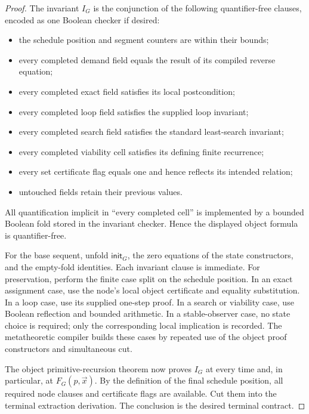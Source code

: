 \begin{proof}
The invariant \(I_G\) is the conjunction of the following quantifier-free clauses, encoded as one Boolean checker if desired:

\begin{itemize}
\item the schedule position and segment counters are within their bounds;
\item every completed demand field equals the result of its compiled reverse equation;
\item every completed exact field satisfies its local postcondition;
\item every completed loop field satisfies the supplied loop invariant;
\item every completed search field satisfies the standard least-search invariant;
\item every completed viability cell satisfies its defining finite recurrence;
\item every set certificate flag equals one and hence reflects its intended relation;
\item untouched fields retain their previous values.
\end{itemize}

All quantification implicit in ``every completed cell'' is implemented by a bounded Boolean fold stored in the invariant checker.  Hence the displayed object formula is quantifier-free.

For the base sequent, unfold \(\mathsf{init}_G\), the zero equations of the state constructors, and the empty-fold identities.  Each invariant clause is immediate.  For preservation, perform the finite case split on the schedule position.  In an exact assignment case, use the node's local object certificate and equality substitution.  In a loop case, use its supplied one-step proof.  In a search or viability case, use Boolean reflection and bounded arithmetic.  In a stable-observer case, no state choice is required; only the corresponding local implication is recorded.  The metatheoretic compiler builds these cases by repeated use of the object proof constructors and simultaneous cut.

The object primitive-recursion theorem now proves \(I_G\) at every time and, in particular, at \(F_G(p,\vec{x})\).  By the definition of the final schedule position, all required node clauses and certificate flags are available.  Cut them into the terminal extraction derivation.  The conclusion is the desired terminal contract.
\end{proof}

